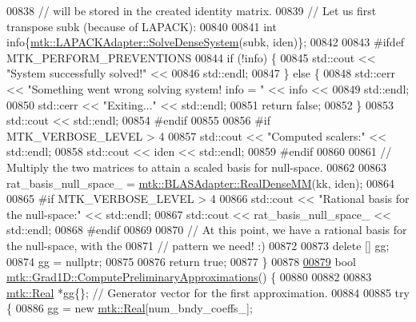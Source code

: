 \begin{DoxyCode}
{{00838   \textcolor{comment}{// will be stored in the created identity matrix.}
00839   \textcolor{comment}{// Let us first transpose subk (because of LAPACK):}
00840 
00841   \textcolor{keywordtype}{int} info\{\hyperlink{classmtk_1_1LAPACKAdapter_a7428bccf74fd4a4af68fb7233846da22}{mtk::LAPACKAdapter::SolveDenseSystem}(subk, iden)\};
00842 
00843 \textcolor{preprocessor}{  #ifdef MTK\_PERFORM\_PREVENTIONS}
00844   \textcolor{keywordflow}{if} (!info) \{
00845     std::cout << \textcolor{stringliteral}{"System successfully solved!"} <<
00846       std::endl;
00847   \} \textcolor{keywordflow}{else} \{
00848     std::cerr << \textcolor{stringliteral}{"Something went wrong solving system! info = "} << info <<
00849       std::endl;
00850     std::cerr << \textcolor{stringliteral}{"Exiting..."} << std::endl;
00851     \textcolor{keywordflow}{return} \textcolor{keyword}{false};
00852   \}
00853   std::cout << std::endl;
00854 \textcolor{preprocessor}{  #endif}
00855 
00856 \textcolor{preprocessor}{  #if MTK\_VERBOSE\_LEVEL > 4}
00857   std::cout << \textcolor{stringliteral}{"Computed scalers:"} << std::endl;
00858   std::cout << iden << std::endl;
00859 \textcolor{preprocessor}{  #endif}
00860 
00861   \textcolor{comment}{// Multiply the two matrices to attain a scaled basis for null-space.}
00862 
00863   rat\_basis\_null\_space\_ = \hyperlink{classmtk_1_1BLASAdapter_acebd0e9bfe0bdd609c7fbea98ccfd3b5}{mtk::BLASAdapter::RealDenseMM}(kk, iden);
00864 
00865 \textcolor{preprocessor}{  #if MTK\_VERBOSE\_LEVEL > 4}
00866   std::cout << \textcolor{stringliteral}{"Rational basis for the null-space:"} << std::endl;
00867   std::cout << rat\_basis\_null\_space\_ << std::endl;
00868 \textcolor{preprocessor}{  #endif}
00869 
00870   \textcolor{comment}{// At this point, we have a rational basis for the null-space, with the}
00871   \textcolor{comment}{// pattern we need! :)}
00872 
00873   \textcolor{keyword}{delete} [] gg;
00874   gg = \textcolor{keyword}{nullptr};
00875 
00876   \textcolor{keywordflow}{return} \textcolor{keyword}{true};
00877 \}
00878 
\hypertarget{mtk__grad__1d_8cc_source_l00879}{}\hyperlink{classmtk_1_1Grad1D_add4c68a6e78d8b9c2b800b3f96f4757d}{00879} \textcolor{keywordtype}{bool} \hyperlink{classmtk_1_1Grad1D_add4c68a6e78d8b9c2b800b3f96f4757d}{mtk::Grad1D::ComputePreliminaryApproximations}() \{
00880 
00882 
00883   \hyperlink{group__c01-roots_gac080bbbf5cbb5502c9f00405f894857d}{mtk::Real} *gg\{\}; \textcolor{comment}{// Generator vector for the first approximation.}
00884 
00885   \textcolor{keywordflow}{try} \{
00886     gg = \textcolor{keyword}{new} \hyperlink{group__c01-roots_gac080bbbf5cbb5502c9f00405f894857d}{mtk::Real}[num\_bndy\_coeffs\_];
}}
\end{DoxyCode}
